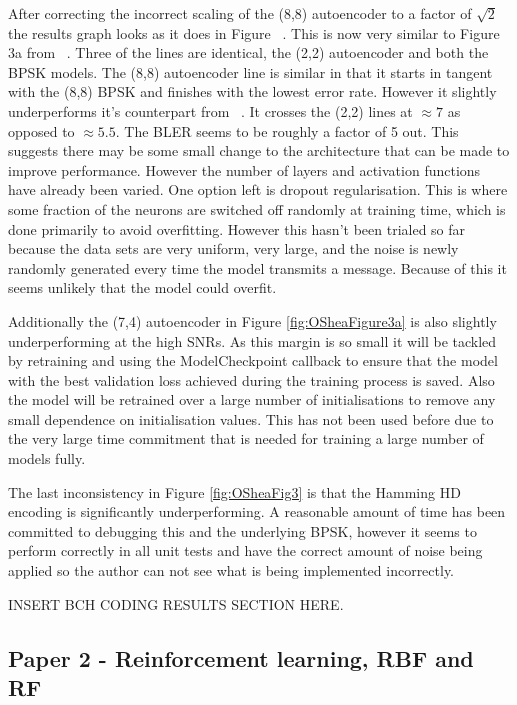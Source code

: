 \documentclass[12pt,onecolumn,letterpaper]{article}
\begin{document}
After correcting the incorrect scaling of the (8,8) autoencoder to a factor of $\sqrt{2}$ the results graph looks as it does in Figure ~\cite{fig:OSheaFigure3b}. This is now very similar to Figure 3a from ~\cite{oShea}. Three of the lines are identical, the (2,2) autoencoder and both the BPSK models. The (8,8) autoencoder line is similar in that it starts in tangent with the (8,8) BPSK and finishes with the lowest error rate. However it slightly underperforms it's counterpart from ~\cite{oShea}. It crosses the (2,2) lines at $\approx7$ as opposed to $\approx5.5$. The BLER seems to be roughly a factor of 5 out. This suggests there may be some small change to the architecture that can be made to improve performance. However the number of layers and activation functions have already been varied. One option left is dropout regularisation. This is where some fraction of the neurons are switched off randomly at training time, which is done primarily to avoid overfitting. However this hasn't been trialed so far because the data sets are very uniform, very large, and the noise is newly randomly generated every time the model transmits a message. Because of this it seems unlikely that the model could overfit. 

Additionally the (7,4) autoencoder in Figure \ref{fig:OSheaFigure3a} is also slightly underperforming at the high SNRs. As this margin is so small it will be tackled by retraining and using the ModelCheckpoint callback to ensure that the model with the best validation loss achieved during the training process is saved. Also the model will be retrained over a large number of initialisations to remove any small dependence on initialisation values. This has not been used before due to the very large time commitment that is needed for training a large number of models fully. 

The last inconsistency in Figure \ref{fig:OSheaFig3} is that the Hamming HD encoding is significantly underperforming. A reasonable amount of time has been committed to debugging this and the underlying BPSK, however it seems to perform correctly in all unit tests and have the correct amount of noise being applied so the author can not see what is being implemented incorrectly. 

INSERT BCH CODING RESULTS SECTION HERE. 

\subsection{Paper 2 - Reinforcement learning, RBF and RF}
\end{document}
